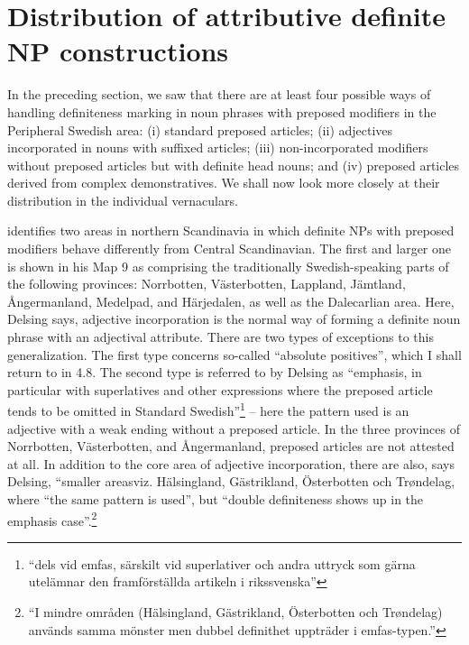 \section{Distribution of attributive definite NP constructions}
\label{bkm:Ref141070030}
In the preceding section, we saw that there are at least four possible ways of handling definiteness marking in noun phrases with preposed modifiers in the Peripheral Swedish area: (i) standard preposed articles; (ii) adjectives incorporated in nouns with suffixed articles; (iii) non-incorporated modifiers without preposed articles but with definite head nouns; and (iv) preposed articles derived from complex demonstratives.  We shall now look more closely at their distribution in the individual vernaculars. 


\citet[49]{Delsing2003a} identifies two areas in northern Scandinavia in which definite NPs with preposed modifiers behave differently from Central Scandinavian. The first and larger one is shown in his Map 9 as comprising the traditionally Swedish-speaking parts of the following provinces: Norrbotten, Västerbotten, Lappland, Jämtland, Ångermanland, Medelpad, and Härjedalen, as well as the Dalecarlian area. Here, Delsing says, adjective incorporation is the normal way of forming a definite noun phrase with an adjectival attribute. There are two types of exceptions to this generalization. The first type concerns so-called “absolute positives”, which I shall return to in 4.8. The second type is referred to by Delsing as “emphasis, in particular with superlatives and other expressions where the preposed article tends to be omitted in Standard Swedish”\footnote{ “dels vid emfas, särskilt vid superlativer och andra uttryck som gärna utelämnar den framförställda artikeln i rikssvenska” } – here the pattern used is an adjective with a weak ending without a preposed article. In the three provinces of Norrbotten, Västerbotten, and Ångermanland, preposed articles are not attested at all. In addition to the core area of adjective incorporation, there are also, says Delsing, “smaller areasviz. Hälsingland, Gästrikland, Österbotten och Trøndelag, where “the same pattern is used”, but “double definiteness shows up in the emphasis case”.\footnote{ “I mindre områden (Hälsingland, Gästrikland, Österbotten och Trøndelag) används samma mönster men dubbel definithet uppträder i emfas-typen.”}

